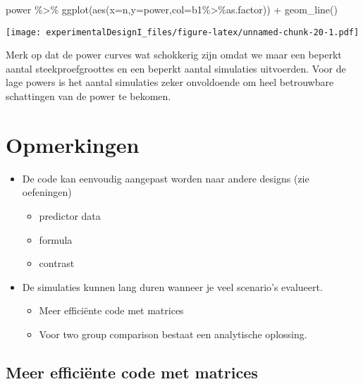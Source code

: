 \documentclass[
]{article}
\newenvironment{Shaded}{\begin{snugshade}}{\end{snugshade}}
\newcommand{\AttributeTok}[1]{\textcolor[rgb]{0.77,0.63,0.00}{#1}}
\newcommand{\FunctionTok}[1]{\textcolor[rgb]{0.00,0.00,0.00}{#1}}
\newcommand{\NormalTok}[1]{#1}
\newcommand{\SpecialCharTok}[1]{\textcolor[rgb]{0.00,0.00,0.00}{#1}}
\providecommand{\tightlist}{%
  \setlength{\itemsep}{0pt}\setlength{\parskip}{0pt}}
\begin{document}
\begin{Shaded}
\begin{Highlighting}[]
\NormalTok{power }\SpecialCharTok{\%\textgreater{}\%} 
  \FunctionTok{ggplot}\NormalTok{(}\FunctionTok{aes}\NormalTok{(}\AttributeTok{x=}\NormalTok{n,}\AttributeTok{y=}\NormalTok{power,}\AttributeTok{col=}\NormalTok{b1}\SpecialCharTok{\%\textgreater{}\%}\NormalTok{as.factor)) }\SpecialCharTok{+}
  \FunctionTok{geom\_line}\NormalTok{()}
\end{Highlighting}
\end{Shaded}

\texttt{[image: experimentalDesignI\_files/figure-latex/unnamed-chunk-20-1.pdf]}

Merk op dat de power curves wat schokkerig zijn omdat we maar een
beperkt aantal steekproefgroottes en een beperkt aantal simulaties
uitvoerden. Voor de lage powers is het aantal simulaties zeker
onvoldoende om heel betrouwbare schattingen van de power te bekomen.

\hypertarget{opmerkingen}{%
\section{Opmerkingen}\label{opmerkingen}}

\begin{itemize}
\item
  De code kan eenvoudig aangepast worden naar andere designs (zie
  oefeningen)

  \begin{itemize}
  \tightlist
  \item
    predictor data
  \item
    formula
  \item
    contrast
  \end{itemize}
\item
  De simulaties kunnen lang duren wanneer je veel scenario's evalueert.

  \begin{itemize}
  \tightlist
  \item
    Meer efficiënte code met matrices
  \item
    Voor two group comparison bestaat een analytische oplossing.
  \end{itemize}
\end{itemize}

\hypertarget{meer-efficiuxebnte-code-met-matrices}{%
\subsection{Meer efficiënte code met
matrices}\label{meer-efficiuxebnte-code-met-matrices}}
\end{document}
